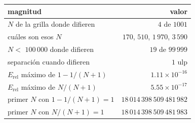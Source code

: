 \begin{tabular}{lr}
\toprule
magnitud & valor \\
\midrule
$N$ de la grilla donde difieren & $4$ de $1001$ \\
cuáles son esos $N$ & $170$, $510$, $1\,970$, $3\,590$ \\
$N <$ $100\,000$ donde difieren & $19$ de $99\,999$ \\
separación cuando difieren & $1$ ulp \\
$E_\mathrm{rel}$ máximo de $1 - 1/(N+1)$ & $1.11 \times 10^{-16}$ \\
$E_\mathrm{rel}$ máximo de $N/(N+1)$ & $5.55 \times 10^{-17}$ \\
primer $N$ con $1 - 1/(N+1) = 1$ & $18\,014\,398\,509\,481\,982$ \\
primer $N$ con $N/(N+1) = 1$ & $18\,014\,398\,509\,481\,983$ \\
\bottomrule
\end{tabular}
